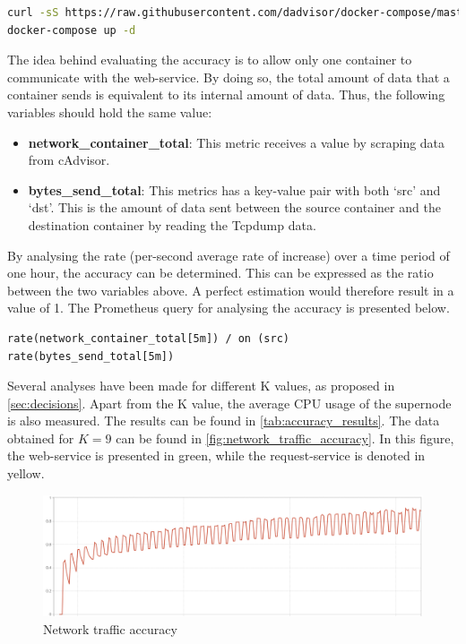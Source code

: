 \begin{lstlisting}[language=bash, caption=Docker-compose]
curl -sS https://raw.githubusercontent.com/dadvisor/docker-compose/master/docker-compose.yml > docker-compose.yml
docker-compose up -d 
\end{lstlisting}

\noindent
The idea behind evaluating the accuracy is to allow only one container to communicate with the web-service. By doing so, the total amount of data that a container sends is equivalent to its internal amount of data. Thus, the following variables should hold the same value:
\begin{itemize}
    \item \textbf{network\_container\_total}: This metric receives a value by scraping data from cAdvisor.
    \item \textbf{bytes\_send\_total}: This metrics has a key-value pair with both `src' and `dst'. This is the amount of data sent between the source container and the destination container by reading the Tcpdump data.
\end{itemize}

\noindent
By analysing the rate (per-second average rate of increase) over a time period of one hour, the accuracy can be determined. This can be expressed as the ratio between the two variables above. A perfect estimation would therefore result in a value of 1. The Prometheus query for analysing the accuracy is presented below.

\begin{verbatim}
rate(network_container_total[5m]) / on (src) 
rate(bytes_send_total[5m])
\end{verbatim}

\noindent
Several analyses have been made for different K values, as proposed in \autoref{sec:decisions}. Apart from the K value, the average CPU usage of the supernode is also measured. The results can be found in \autoref{tab:accuracy_results}. The data obtained for $K = 9$ can be found in \autoref{fig:network_traffic_accuracy}. In this figure, the web-service is presented in green, while the request-service is denoted in yellow.

\begin{figure}
    \centering
    \includegraphics[width=\textwidth]{gfx/traffic_network_accuracy}
    \caption{Network traffic accuracy}
    \label{fig:network_traffic_accuracy}
\end{figure}

